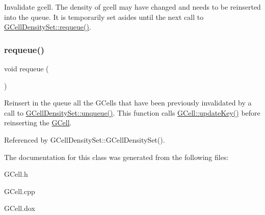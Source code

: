 Invalidate {\ttfamily gcell}. The density of {\ttfamily gcell} may have changed and needs to be reinserted into the queue. It is temporarily set asides until the next call to \mbox{\hyperlink{classKatabatic_1_1GCellDensitySet_ac84efe46d8a3c409e85bc3420240c3c2}{G\+Cell\+Density\+Set\+::requeue()}}. \mbox{\label{classKatabatic_1_1GCellDensitySet_ac84efe46d8a3c409e85bc3420240c3c2}} 
\subsubsection{\texorpdfstring{requeue()}{requeue()}}
{\footnotesize\ttfamily void requeue (\begin{DoxyParamCaption}{ }\end{DoxyParamCaption})}

Reinsert in the queue all the G\+Cells that have been previously invalidated by a call to \mbox{\hyperlink{classKatabatic_1_1GCellDensitySet_a89099ec88eadcadb942b7d64a6ffd7ee}{G\+Cell\+Density\+Set\+::unqueue()}}. This function calls \mbox{\hyperlink{classKatabatic_1_1GCell_a11beff0f0bec06d0f3e080969516dfc3}{G\+Cell\+::update\+Key()}} before reinserting the \mbox{\hyperlink{classKatabatic_1_1GCell}{G\+Cell}}. 

Referenced by G\+Cell\+Density\+Set\+::\+G\+Cell\+Density\+Set().



The documentation for this class was generated from the following files\+:\begin{DoxyCompactItemize}
\item 
G\+Cell.\+h\item 
G\+Cell.\+cpp\item 
G\+Cell.\+dox\end{DoxyCompactItemize}
